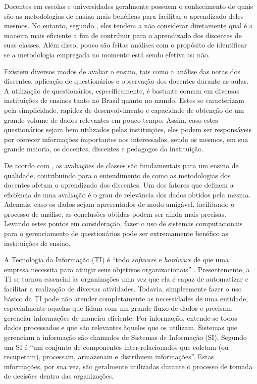 \documentclass[
  12pt,       %
  openright,      %
  oneside,      %
  a4paper,      %
  english,      %
  french,        %
  spanish,     %
  brazil        %
  ]{abntex2-decsi}
\begin{document}
Docentes em escolas e universidades geralmente possuem o conhecimento de quais são as metodologias de ensino mais benéficas para facilitar o aprendizado deles mesmos. No entanto, segundo , eles tendem a não considerar diretamente qual é a maneira mais eficiente a fim de contribuir para o aprendizado dos discentes de suas classes. Além disso, pouco são feitas análises com o propósito de identificar se a metodologia empregada no momento está sendo efetiva ou não. 

Existem diversos modos de avaliar o ensino, tais como a análise das notas dos discentes, aplicação de questionários e observação dos docentes durante as aulas. A utilização de questionários, especificamente, é bastante comum em diversas instituições de ensinos tanto no Brasil quanto no mundo. Estes se caracterizam pela simplicidade, rapidez de desenvolvimento e capacidade de obtenção de um grande volume de dados relevantes em pouco tempo. Assim, caso estes questionários sejam bem utilizados pelas instituições, eles podem ser responsáveis por oferecer informações importantes aos interessados, sendo os mesmos, em sua grande maioria, os docentes, discentes e pedagogos da instituição.

De acordo com , as avaliações de classes são fundamentais para um ensino de qualidade, contribuindo para o entendimento de como as metodologias dos docentes afetam o aprendizado dos discentes. Um dos fatores que definem a eficiência de uma avaliação é o grau de relevância dos dados obtidos pela mesma. Ademais, caso os dados sejam apresentados de modo amigável, facilitando o processo de análise, as conclusões obtidas podem ser ainda mais precisas. Levando estes pontos em consideração, fazer o uso de sistemas computacionais para o gerenciamento de questionários pode ser extremamente benéfico as instituições de ensino.

A Tecnologia da Informação (TI) é ``todo \textit{software} e \textit{hardware} de que uma empresa necessita para atingir seus objetivos organizacionais'' \cite[p. 12]{laudon:2010}. Presentemente, a TI se tornou essencial às organizações uma vez que ela é capaz de automatizar e facilitar a realização de diversas atividades. Todavia, simplesmente fazer o uso básico da TI pode não atender completamente as necessidades de uma entidade, especialmente aquelas que lidam com um grande fluxo de dados e precisam gerenciar informações de maneira eficiente. Por informação, entende-se todos dados processados e que são relevantes àqueles que os utilizam. Sistemas que gerenciam a informação são chamados de Sistemas de Informação (SI). Segundo  um SI é ``um conjunto de componentes inter-relacionados que coletam (ou recuperam), processam, armazenam e distribuem informações''. Estas informações, por sua vez, são geralmente utilizadas durante o processo de tomada de decisões dentro das organizações.
\end{document}
